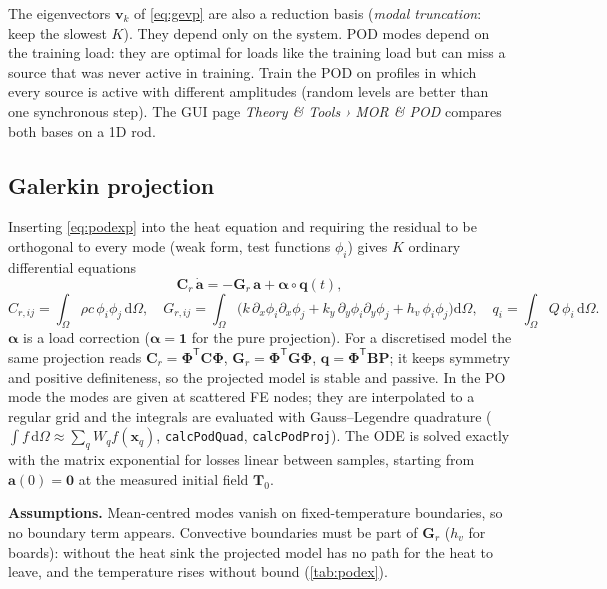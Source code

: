 \documentclass[11pt,a4paper]{article}
\newcommand{\T}{^{\mathsf T}}
\newcommand{\mat}[1]{\bm{#1}}
\begin{document}
\begin{keybox}
The eigenvectors $\bm v_k$ of \eqref{eq:gevp} are also a reduction basis (\emph{modal truncation}: keep the slowest
$K$). They depend only on the system. POD modes depend on the training load: they are optimal for loads like the
training load but can miss a source that was never active in training. Train the POD on profiles in which every source
is active with different amplitudes (random levels are better than one synchronous step). The GUI page
\emph{Theory \& Tools › MOR \& POD} compares both bases on a 1D rod.
\end{keybox}

\subsection{Galerkin projection}
Inserting \eqref{eq:podexp} into the heat equation and requiring the residual to be orthogonal to every mode
(weak form, test functions $\phi_i$) gives $K$ ordinary differential equations
\begin{equation}
  \mat C_r\,\dot{\bm a} = -\mat G_r\,\bm a + \bm\alpha\circ\bm q(t),
  \label{eq:galerkin}
\end{equation}
\begin{equation}
  C_{r,ij} = \int_\Omega \rho c\,\phi_i\phi_j\,\mathrm d\Omega,\quad
  G_{r,ij} = \int_\Omega\bigl(k\,\partial_x\phi_i\partial_x\phi_j + k_y\,\partial_y\phi_i\partial_y\phi_j +
  h_v\,\phi_i\phi_j\bigr)\mathrm d\Omega,\quad
  q_i = \int_\Omega Q\,\phi_i\,\mathrm d\Omega .
\end{equation}
$\bm\alpha$ is a load correction ($\bm\alpha=\bm 1$ for the pure projection). For a discretised model the same
projection reads $\mat C_r=\bm\Phi\T\mat C\bm\Phi$, $\mat G_r=\bm\Phi\T\mat G\bm\Phi$, $\bm q=\bm\Phi\T\mat B\bm P$;
it keeps symmetry and positive definiteness, so the projected model is stable and passive. In the PO mode the modes
are given at scattered FE nodes; they are interpolated to a regular grid and the integrals are evaluated with
Gauss--Legendre quadrature ($\int f\,\mathrm d\Omega\approx\sum_q W_qf(\bm x_q)$, \texttt{calcPodQuad},
\texttt{calcPodProj}). The ODE is solved exactly with the matrix exponential for losses linear between samples,
starting from $\bm a(0)=\bm 0$ at the measured initial field $\bm T_0$.

\textbf{Assumptions.} Mean-centred modes vanish on fixed-temperature boundaries, so no boundary term appears.
Convective boundaries must be part of $\mat G_r$ ($h_v$ for boards): without the heat sink the projected model has no
path for the heat to leave, and the temperature rises without bound (\cref{tab:podex}).
\end{document}
